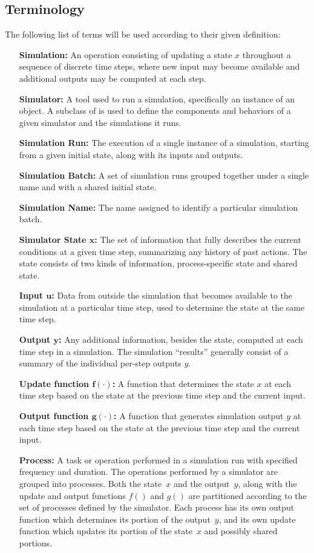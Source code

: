 \documentclass[12pt]{article}
\newcommand{\code}[1]{{\relsize{-0.5}{\tt{{#1}}}}}  %
\numberwithin{equation}{section}
\numberwithin{table}{section}
\numberwithin{figure}{section}
\begin{document}
\subsection{Terminology}
The following list of terms will be used according to their given definition:
\begin{itemize}
\item[\bf Simulation:] An operation consisting of updating a state $x$ throughout a sequence of discrete time steps, where new input may become available and additional outputs may be computed at each step.
\item[\bf Simulator:] A tool used to run a simulation, specifically an instance of an \code{mpsim} object. A subclass of \code{mpsim} is used to define the components and behaviors of a given simulator and the simulations it runs.
\item[\bf Simulation Run:] The execution of a single instance of a simulation, starting from a given initial state, along with its inputs and outputs.
\item[\bf Simulation Batch:] A set of simulation runs grouped together under a single name and with a shared initial state.
\item[\bf Simulation Name:] The name assigned to identify a particular simulation batch.
\item[\bf Simulator State $\boldsymbol{x}$:] The set of information that fully describes the current conditions at a given time step, summarizing any history of past actions. The state consists of two kinds of information, process-specific state and shared state.
\item[\bf Input $\boldsymbol{u}$:] Data from outside the simulation that becomes available to the simulation at a particular time step, used to determine the state at the same time step.
\item[\bf Output $\boldsymbol{y}$:] Any additional information, besides the state, computed at each time step in a simulation. The simulation ``results'' generally consist of a summary of the individual per-step outputs $y$.
\item[\bf Update function $\boldsymbol{f(\cdot)}$:] A function that determines the state $x$ at each time step based on the state at the previous time step and the current input.
\item[\bf Output function $\boldsymbol{g(\cdot)}$:] A function that generates simulation output $y$ at each time step based on the state at the previous time step and the current input.
\item[\bf Process:] A task or operation performed in a simulation run with specified frequency and duration. The operations performed by a simulator are grouped into processes. Both the state~$x$ and the output~$y$, along with the update and output functions $f()$ and $g()$ are partitioned according to the set of processes defined by the simulator. Each process has its own output function which determines its portion of the output~$y$, and its own update function which updates its portion of the state~$x$ and possibly shared portions.

\end{itemize}
\end{document}
